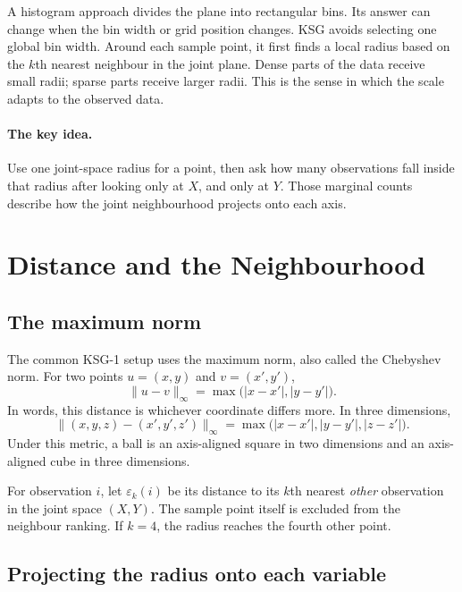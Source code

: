 \documentclass[11pt,letterpaper,oneside]{report}
\newcommand{\KSG}{\textsc{KSG}}
\newcommand{\epsk}{\varepsilon_k}
\begin{document}
A histogram approach divides the plane into rectangular bins. Its answer can change when the bin width or grid position changes. \KSG{} avoids selecting one global bin width. Around each sample point, it first finds a local radius based on the $k$th nearest neighbour in the joint plane. Dense parts of the data receive small radii; sparse parts receive larger radii. This is the sense in which the scale adapts to the observed data.

\paragraph{The key idea.} Use one joint-space radius for a point, then ask how many observations fall inside that radius after looking only at $X$, and only at $Y$. Those marginal counts describe how the joint neighbourhood projects onto each axis.

\section{Distance and the Neighbourhood}

\subsection{The maximum norm}

The common \KSG-1 setup uses the maximum norm, also called the Chebyshev norm. For two points $u=(x,y)$ and $v=(x',y')$,
\begin{equation}
  \lVert u-v\rVert_\infty = \max\bigl(|x-x'|,|y-y'|\bigr).
\end{equation}
In words, this distance is whichever coordinate differs more. In three dimensions,
\begin{equation}
  \lVert (x,y,z)-(x',y',z')\rVert_\infty
  =\max\bigl(|x-x'|,|y-y'|,|z-z'|\bigr).
\end{equation}
Under this metric, a ball is an axis-aligned square in two dimensions and an axis-aligned cube in three dimensions.

For observation $i$, let $\epsk(i)$ be its distance to its $k$th nearest \emph{other} observation in the joint space $(X,Y)$. The sample point itself is excluded from the neighbour ranking. If $k=4$, the radius reaches the fourth other point.

\subsection{Projecting the radius onto each variable}
\end{document}

